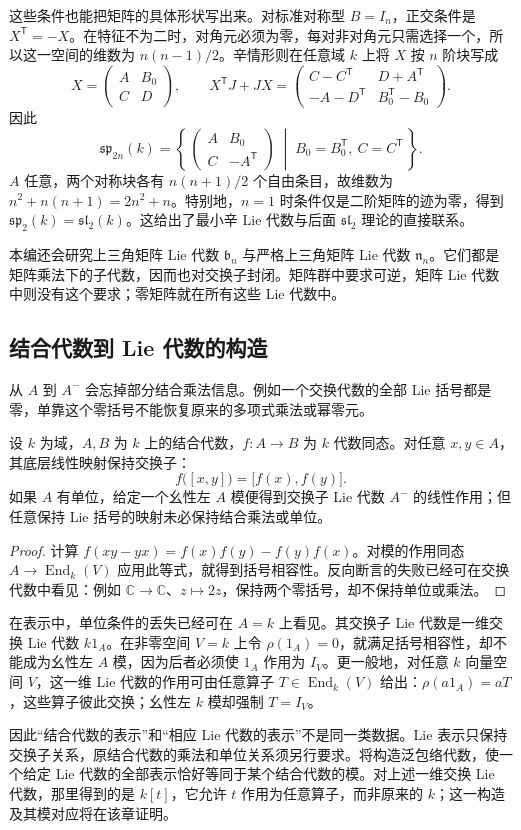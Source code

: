这些条件也能把矩阵的具体形状写出来。对标准对称型 \(B=I_n\)，正交条件是 \(X^{\mathsf T}=-X\)。在特征不为二时，对角元必须为零，每对非对角元只需选择一个，所以这一空间的维数为 \(n(n-1)/2\)。辛情形则在任意域 \(k\) 上将 \(X\) 按 \(n\) 阶块写成
\[
	X=\begin{pmatrix}A&B_0\\ C&D\end{pmatrix},\qquad
	X^{\mathsf T}J+JX
	=\begin{pmatrix}
		C-C^{\mathsf T}&D+A^{\mathsf T}\\
		-A-D^{\mathsf T}&B_0^{\mathsf T}-B_0
	\end{pmatrix}.
\]
因此
\[
	\mathfrak{sp}_{2n}(k)
	=\left\{\,\begin{pmatrix}A&B_0\\ C&-A^{\mathsf T}\end{pmatrix}
	\;\middle|\; B_0=B_0^{\mathsf T},\ C=C^{\mathsf T}\,\right\}.
\]
\(A\) 任意，两个对称块各有 \(n(n+1)/2\) 个自由条目，故维数为 \(n^2+n(n+1)=2n^2+n\)。特别地，\(n=1\) 时条件仅是二阶矩阵的迹为零，得到 \(\mathfrak{sp}_2(k)=\mathfrak{sl}_2(k)\)。这给出了最小辛 Lie 代数与后面 \(\mathfrak{sl}_2\) 理论的直接联系。

\ProseParagraphBreak

本编还会研究上三角矩阵 Lie 代数 \(\mathfrak b_n\) 与严格上三角矩阵 Lie 代数 \(\mathfrak n_n\)。它们都是矩阵乘法下的子代数，因而也对交换子封闭。矩阵群中要求可逆，矩阵 Lie 代数中则没有这个要求；零矩阵就在所有这些 Lie 代数中。

\subsection{结合代数到 Lie 代数的构造}
\label{b5:subsec:1101:03}

从 \(A\) 到 \(A^{-}\) 会忘掉部分结合乘法信息。例如一个交换代数的全部 Lie 括号都是零，单靠这个零括号不能恢复原来的多项式乘法或幂零元。
\begin{proposition}\label{b5:prop:associative-map-lie-map}
	设 \(k\) 为域，\(A,B\) 为 \(k\) 上的结合代数，\(f:A\to B\) 为 \(k\) 代数同态。对任意 \(x,y\in A\)，其底层线性映射保持交换子：
	\[
		f\bigl([x,y]\bigr)=\bigl[f(x),f(y)\bigr].
	\]
	如果 \(A\) 有单位，给定一个幺性左 \(A\) 模便得到交换子 Lie 代数 \(A^{-}\) 的线性作用；但任意保持 Lie 括号的映射未必保持结合乘法或单位。
\end{proposition}
\begin{proof}
	计算 \(f(xy-yx)=f(x)f(y)-f(y)f(x)\)。对模的作用同态 \(A\to\operatorname{End}_k(V)\) 应用此等式，就得到括号相容性。反向断言的失败已经可在交换代数中看见：例如 \(\mathbb C\to\mathbb C\)、\(z\mapsto2z\)，保持两个零括号，却不保持单位或乘法。
\end{proof}
在表示中，单位条件的丢失已经可在 \(A=k\) 上看见。其交换子 Lie 代数是一维交换 Lie 代数 \(k1_A\)。在非零空间 \(V=k\) 上令 \(\rho(1_A)=0\)，就满足括号相容性，却不能成为幺性左 \(A\) 模，因为后者必须使 \(1_A\) 作用为 \(I_V\)。更一般地，对任意 \(k\) 向量空间 \(V\)，这一维 Lie 代数的作用可由任意算子 \(T\in\operatorname{End}_k(V)\) 给出：\(\rho(a1_A)=aT\)，这些算子彼此交换；幺性左 \(k\) 模却强制 \(T=I_V\)。

\ProseParagraphBreak

因此“结合代数的表示”和“相应 Lie 代数的表示”不是同一类数据。Lie 表示只保持交换子关系，原结合代数的乘法和单位关系须另行要求。将构造泛包络代数，使一个给定 Lie 代数的全部表示恰好等同于某个结合代数的模。对上述一维交换 Lie 代数，那里得到的是 \(k[t]\)，它允许 \(t\) 作用为任意算子，而非原来的 \(k\)；这一构造及其模对应将在该章证明。
